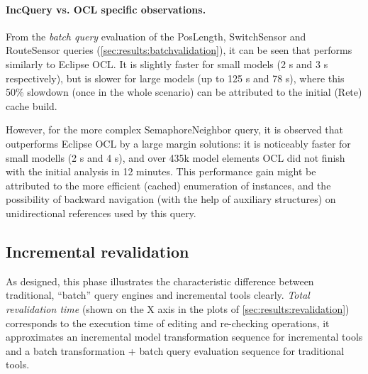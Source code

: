 \paragraph{IncQuery vs. OCL specific observations.}

 
From the \emph{batch query} evaluation of the \textsf{PosLength},
\textsf{SwitchSensor} and \textsf{RouteSensor} queries
(\autoref{sec:results:batchvalidation}), it can be seen that \eiq performs
similarly to Eclipse OCL. It is slightly faster for small models (2 s and 3 s
respectively), but is slower for large models (up to 125 s and 78 s), where this
50\% slowdown (once in the whole scenario) can be attributed to the initial
(Rete) cache build.


However, for the more complex \textsf{SemaphoreNeighbor} query, it is observed that
\eiq outperforms Eclipse OCL by a large margin solutions: it is noticeably
faster for small modells (2 s and 4 s), and over 435k model elements OCL did not
finish with the initial analysis in 12 minutes. This performance gain might be
attributed to the more efficient (cached) enumeration of instances, and the
possibility of backward navigation (with the help of auxiliary structures) on
unidirectional references used by this query.



\subsection{Incremental revalidation}
As designed, this phase illustrates the characteristic difference between traditional, ``batch'' query engines and incremental tools clearly. \emph{Total revalidation time} (shown on the X axis in the plots of \autoref{sec:results:revalidation}) corresponds to the execution time of editing and re-checking operations, \ie it approximates an incremental model transformation sequence for incremental tools and a batch transformation + batch query evaluation sequence for traditional tools.

